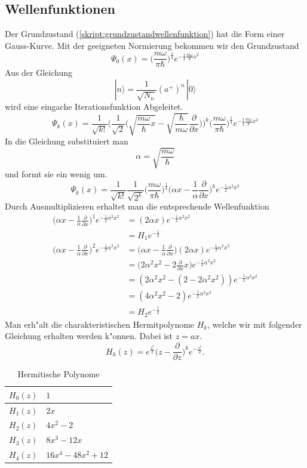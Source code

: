 \begin{refsection}
\subsection{Wellenfunktionen}
Der Grundzustand (\ref{skript:grundzustandwellenfunktion}) hat die Form einer Gauss-Kurve. Mit der geeigneten Normierung bekommen wir den Grundzustand
\[
\Psi_0(x)
=
\biggl(\frac{m\omega}{\pi\hbar}\biggr)^\frac14
e^{-\frac12\frac{m\omega}{\hbar}x^2}
\]
Aus der Gleichung
\[
|n\rangle
=
\frac{1}{\sqrt{N_n}}(a^+)^n\,|0\rangle
\]
wird eine eingache Iterationsfunktion Abgeleitet.
\[
\Psi_k(x)
=
\frac1{\sqrt{k!}}\biggl(\frac1{\sqrt{2}}
\biggl(\sqrt{\frac{m\omega}{\hbar}x}-
\sqrt{\frac{\hbar}{m\omega}}\frac{\partial}{\partial x}\biggr)\biggr)^k
\biggl(\frac{m\omega}{\pi\hbar}\biggr)^\frac14
e^{-\frac12\frac{m\omega}{\hbar}x^2}
\]
In die Gleichung substituiert man
\[
\alpha=\sqrt{\frac{m\omega}\hbar}
\]
und formt sie ein wenig um.
\[
\Psi_k(x)
=
\frac1{\sqrt{k!}}\frac1{\sqrt{2^k}}
\biggl(\frac{m\omega}{\pi\hbar}\biggr)^\frac14
\biggl(\alpha x-\frac1{\alpha}\frac{\partial}{\partial x}\biggr)^k
e^{-\frac12\alpha^2x^2}
\]
Durch Ausmultiplizieren erhaltet man die entsprechende Wellenfunktion
\begin{align*}
\biggl(\alpha x-\frac1{\alpha}\frac{\partial}{\partial x}\biggr)^1
e^{-\frac12\alpha^2x^2}
&=
(2\alpha x)e^{-\frac12\alpha^2x^2}
\\
&=
H_1 e^{-\frac12}
\\
\biggl(\alpha x-\frac1{\alpha}\frac{\partial}{\partial x}\biggr)^2
e^{-\frac12\alpha^2x^2}
&=
\biggl(\alpha x-\frac1{\alpha}\frac{\partial}{\partial x}\biggr)
(2\alpha x)e^{-\frac12\alpha^2x^2}
\\
&=
\biggl(2\alpha^2 x^2-2\frac{\partial}{\partial x}x\biggr)
e^{-\frac12\alpha^2x^2}
\\
&=
(2\alpha^2x^2-(2-2\alpha^2x^2))e^{-\frac12\alpha^2x^2}
\\
&=
(4\alpha^2x^2-2)e^{-\frac12\alpha^2x^2}
\\
&=
H_2 e^{-\frac12}
\end{align*}
Man erh"alt die charakteristischen Hermitpolynome $H_k$, welche wir mit folgender Gleichung erhalten werden k"onnen. Dabei ist $z=ax$.
\[
H_k(z)
=
e^{\frac{z^2}2}\biggl(z-\frac{\partial}{\partial z}\biggr)^k
e^{-\frac{z^2}2}.
\]

\begin{table}[h]
\centering
\begin{tabular}{|l|l|}
\hline
$H_0 (z)$ & $1$					\\ \hline
$H_1 (z)$ & $2x$				\\ \hline
$H_2 (z)$ & $4x^2-2$				\\ \hline
$H_3 (z)$ & $8x^3-12x$				\\ \hline
$H_4 (z)$ & $16x^4-48x^2+12$			\\ \hline
\end{tabular}
\caption{Hermitische Polynome\label{skript:Hermitpolynom}}
\end{table}


\end{refsection}
